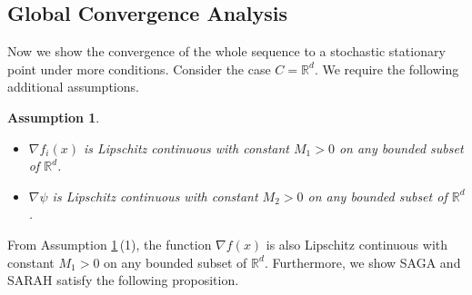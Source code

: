 \documentclass[letterpaper]{article} %
\newtheorem{assumption}{Assumption}
\begin{document}
	\subsection{Global Convergence Analysis}
	Now we show the convergence of  the whole sequence to a  stochastic stationary point under more conditions.
	Consider the case  $C=\mathbb{R}^{d}$. 
	We require the following additional assumptions. 
	\begin{assumption}\label{assume_03}
		\begin{itemize}
			\item $\nabla f_{i}(x)$ is Lipschitz continuous with constant $M_{1} > 0$ on any bounded subset of $\mathbb{R}^{d}$. 
			\item   $\nabla \psi $ is Lipschitz continuous with  constant $M_{2} > 0$ on any bounded subset of $\mathbb{R}^{d}$.
		\end{itemize}
	\end{assumption}
	From Assumption \ref{assume_03}\,(1), the function $\nabla f(x)$ is also Lipschitz continuous with constant $M_{1} > 0$ on any bounded subset of $\mathbb{R}^{d}$. 
	Furthermore, we show SAGA \cite{DefazioBL14} and SARAH \cite{NguyenLST17} satisfy  the following proposition.
\end{document}
